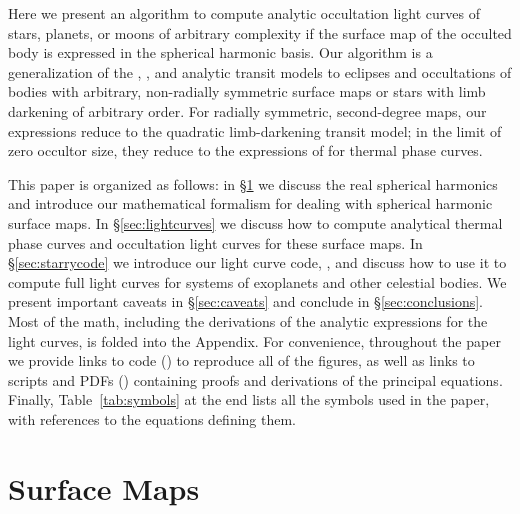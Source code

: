 \documentclass[modern]{aastex61}
\begin{document}
Here we present an algorithm to compute analytic occultation light curves of stars,
planets, or moons of arbitrary complexity if the surface map of the occulted body is expressed in the
spherical harmonic basis. Our algorithm is a generalization of the \citet{MandelAgol2002}, \citet{Gimenez2006},
and \citet{Pal2012} analytic transit models to eclipses and occultations of bodies with arbitrary, non-radially
symmetric surface maps or stars with limb darkening of arbitrary order.
For radially symmetric, second-degree maps, our expressions reduce to the \citet{MandelAgol2002}
quadratic limb-darkening transit model; in the limit of zero occultor size, they
reduce to the expressions of \citet{Haggard2018} for thermal phase curves.


This paper is organized as follows: in \S\ref{sec:surfacemaps} we discuss the
real spherical harmonics and introduce our mathematical formalism for
dealing with spherical harmonic surface maps. In \S\ref{sec:lightcurves} we
discuss how to compute analytical thermal phase curves and occultation light curves
for these surface maps. In \S\ref{sec:starrycode} we introduce our
light curve code, \starry, and discuss how to use it to compute full
light curves for systems of exoplanets and other celestial bodies. We
present important caveats in \S\ref{sec:caveats} and conclude in \S\ref{sec:conclusions}.
Most of the math, including the derivations of the analytic expressions for the
light curves, is folded into the Appendix. For convenience, throughout
the paper we provide links
to \Python code (\pythonlogo{}) to reproduce all of the
figures, as well as links to \Mathematica \citep{Mathematica}
scripts and PDFs (\penlogo{}) containing proofs and derivations
of the principal
equations. Finally, Table~\ref{tab:symbols} at the end lists
all the symbols used
in the paper, with references to the equations defining them.

\section{Surface Maps}
\label{sec:surfacemaps}
\end{document}
